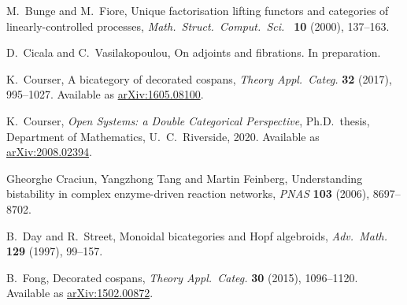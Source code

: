 \documentclass[reqno]{amsart}
\theoremstyle{definition}
\theoremstyle{remark}
\begin{document}
\begin{thebibliography}{100}



 M.\ Bunge and M.\ Fiore, Unique factorisation lifting functors and categories of linearly-controlled processes, \textsl{Math.\ Struct.\ Comput.\ Sci.\ } \textbf{10} (2000), 137--163.


 D.\ Cicala and C.\ Vasilakopoulou, On adjoints and fibrations. In preparation.

 K.\ Courser, A bicategory of decorated cospans, \textsl{Theory Appl.\ Categ.} \textbf{32} (2017), 995--1027. Available as \href{https://arxiv.org/abs/1605.08100}{arXiv:1605.08100}.

 K.\ Courser, \textsl{Open Systems: a Double Categorical Perspective}, Ph.D.\ thesis, Department of Mathematics, U.\ C.\ Riverside, 2020.  Available as \href{https://arxiv.org/abs/2008.02394}{arXiv:2008.02394}.

 Gheorghe Craciun, Yangzhong Tang and Martin Feinberg, Understanding bistability in complex enzyme-driven reaction networks, \textsl{PNAS} \textbf{103} (2006), 8697--8702.  

 B.\ Day and R.\ Street, Monoidal bicategories and Hopf algebroids, \textsl{Adv.\ Math.} \textbf{129} (1997), 99--157.



 B.\ Fong, Decorated cospans, \emph{Theory Appl.\ Categ.} \textbf{30} (2015), 1096--1120.  Available as \href{http://arxiv.org/abs/1502.00872}{arXiv:1502.00872}.


\end{thebibliography}
\end{document}
